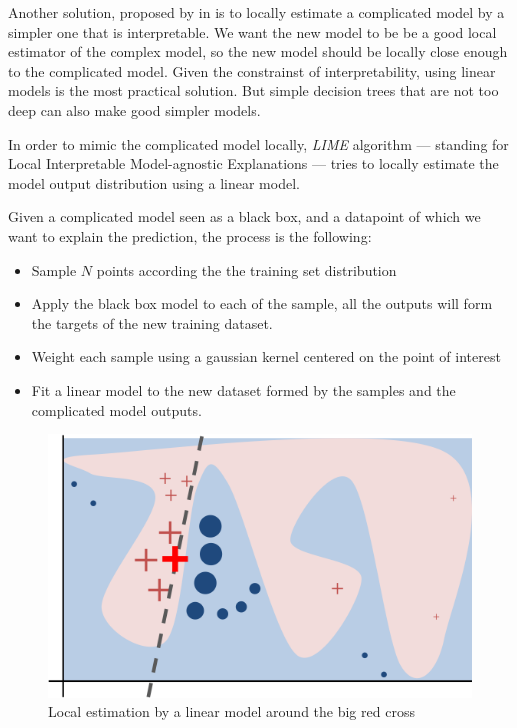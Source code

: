 \documentclass[a4paper,11pt]{kth-mag}
\begin{document}
Another solution, proposed by \citeauthor{lime} in  is to locally estimate a complicated model by a simpler one that is interpretable. We want the new model to be  be a good local estimator of the complex model, so the new model should be locally close enough to the complicated model. Given the constrainst of interpretability, using linear models is the most practical solution. But simple decision trees that are not too deep can also make good simpler models.

In order to mimic the complicated model locally, \textit{LIME} algorithm --- standing for Local Interpretable Model-agnostic Explanations --- tries to locally estimate the model output distribution using a linear model.

Given a complicated model seen as a black box, and a datapoint of which we want to explain the prediction, the process is the following:

\begin{itemize}
	\item Sample $N$ points according the the training set distribution
	\item Apply the black box model to each of the sample, all the outputs will form the targets of the new training dataset.
	\item Weight each sample using a gaussian kernel centered on the point of interest
	\item Fit a linear model to the new dataset formed by the samples and the complicated model outputs.
\end{itemize}

\begin{figure}[!h]
	\centering
   	\def\svgwidth{\columnwidth}
	\includegraphics{lime-schema.png}
    \caption{Local estimation by a linear model around the big red cross}
\end{figure}
\end{document}
